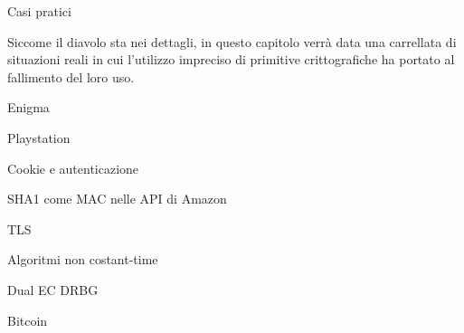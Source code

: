 \capitolo Casi pratici

Siccome il diavolo sta nei dettagli, in questo capitolo verr\`a data una carrellata
di situazioni reali in cui l'utilizzo impreciso di primitive crittografiche ha portato
al fallimento del loro uso.

\sezione Enigma

\sezione Playstation

\sezione Cookie e autenticazione

\sezione SHA1 come MAC nelle API di Amazon

\sezione TLS

\sezione Algoritmi non costant-time

\sezione Dual EC DRBG

\sezione Bitcoin

